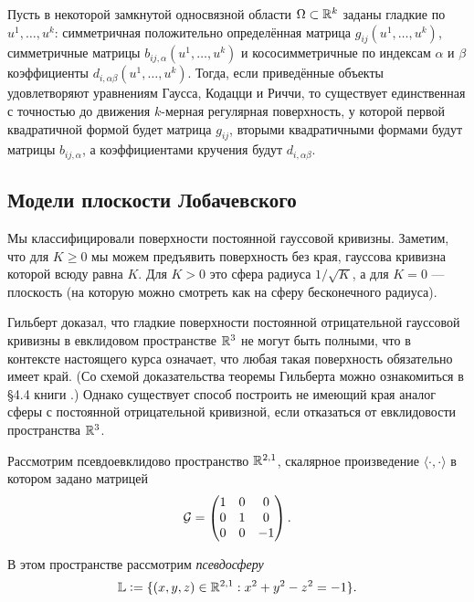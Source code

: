 \begin{theorem}[Бонне]
	Пусть в некоторой замкнутой односвязной области $\Omega \subset \mathbb{R}^k$ заданы гладкие по $u^1, \ldots, u^k$: симметричная положительно определённая матрица $g_{ij}(u^1, \ldots, u^k)$, симметричные матрицы $b_{ij, \alpha}(u^1, \ldots, u^k)$ и кососимметричные по индексам $\alpha$ и $\beta$ коэффициенты $d_{i, \alpha\beta}(u^1, \ldots, u^k)$. Тогда, если приведённые объекты удовлетворяют уравнениям Гаусса, Кодацци и Риччи, то существует единственная с точностью до движения $k$-мерная регулярная поверхность, у которой первой квадратичной формой будет матрица $g_{ij}$, вторыми квадратичными формами будут матрицы $b_{ij, \alpha}$, а коэффициентами кручения будут $d_{i, \alpha\beta}$.
\end{theorem}

\subsection{Модели плоскости Лобачевского}

Мы классифицировали поверхности постоянной гауссовой кривизны. Заметим, что для $K \geqslant 0$ мы можем предъявить поверхность без края, гауссова кривизна которой всюду равна $K$. Для $K > 0$ это сфера радиуса $1 / \sqrt{K}$, а для $K = 0$ --- плоскость (на которую можно смотреть как на сферу бесконечного радиуса).

Гильберт доказал, что гладкие поверхности постоянной отрицательной гауссовой кривизны в евклидовом пространстве $\mathbb{R}^3$ не могут быть полными, что в контексте настоящего курса означает, что любая такая поверхность обязательно имеет край. (Со схемой доказательства теоремы Гильберта можно ознакомиться в \S 4{.}4 книги \cite{NT14}.) Однако существует способ построить не имеющий края аналог сферы с постоянной отрицательной кривизной, если отказаться от евклидовости пространства $\mathbb{R}^3$.

Рассмотрим псевдоевклидово пространство $\mathbb{R}^{2, 1}$, скалярное произведение $\langle\cdot, \cdot\rangle$ в котором задано матрицей
\begin{equation*}
	\mathcal{G} =
	\begin{pmatrix}
		1 & 0 & 0\\
		0 & 1 & 0\\
		0 & 0 & -1
	\end{pmatrix}.
\end{equation*}

\noindent
В этом пространстве рассмотрим \textit{псевдосферу}
\[
	\mathbb{L} \vcentcolon = \{(x, y, z) \in \mathbb{R}^{2, 1} : x^2 + y^2 - z^2 = -1\}.
\]

